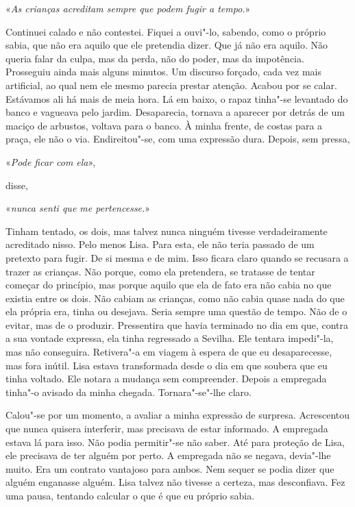 «\emph{As crianças acreditam sempre que podem fugir a tempo.}»

Continuei calado e não contestei. Fiquei a ouvi"-lo, sabendo, como o
próprio sabia, que não era aquilo que ele pretendia dizer. Que já não
era aquilo. Não queria falar da culpa, mas da perda, não do poder, mas
da impotência. Prosseguiu ainda mais alguns minutos. Um discurso
forçado, cada vez mais artificial, ao qual nem ele mesmo parecia prestar
atenção. Acabou por se calar. Estávamos ali há mais de meia hora. Lá em
baixo, o rapaz tinha"-se levantado do banco e vagueava pelo jardim.
Desaparecia, tornava a aparecer por detrás de um maciço de arbustos,
voltava para o banco. À minha frente, de costas para a praça, ele não o
via. Endireitou"-se, com uma expressão dura. Depois, sem pressa,

«\emph{Pode ficar com ela}»,

disse,

«\emph{nunca senti que me pertencesse.}»

Tinham tentado, os dois, mas talvez nunca ninguém tivesse
verdadeiramente acreditado nisso. Pelo menos Lisa. Para esta, ele não
teria passado de um pretexto para fugir. De si mesma e de mim. Isso
ficara claro quando se recusara a trazer as crianças. Não porque, como
ela pretendera, se tratasse de tentar começar do princípio, mas porque
aquilo que ela de fato era não cabia no que existia entre os dois. Não
cabiam as crianças, como não cabia quase nada do que ela própria era,
tinha ou desejava. Seria sempre uma questão de tempo. Não de o evitar,
mas de o produzir. Pressentira que havia terminado no dia em que, contra
a sua vontade expressa, ela tinha regressado a Sevilha. Ele tentara
impedi"-la, mas não conseguira. Retivera"-a em viagem à espera de que eu
desaparecesse, mas fora inútil. Lisa estava transformada desde o dia em
que soubera que eu tinha voltado. Ele notara a mudança sem compreender.
Depois a empregada tinha"-o avisado da minha chegada. Tornara"-se"-lhe
claro.

Calou"-se por um momento, a avaliar a minha expressão de surpresa.
Acrescentou que nunca quisera interferir, mas precisava de estar
informado. A empregada estava lá para isso. Não podia permitir"-se não
saber. Até para proteção de Lisa, ele precisava de ter alguém por
perto. A empregada não se negava, devia"-lhe muito. Era um contrato
vantajoso para ambos. Nem sequer se podia dizer que alguém enganasse
alguém. Lisa talvez não tivesse a certeza, mas desconfiava. Fez uma
pausa, tentando calcular o que é que eu próprio sabia.

